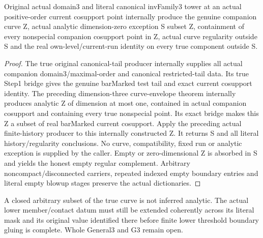 \begin{theorem}
\label{hir:step-one-actual-general-three-companion-curve-history}
\leanok
Original actual domain3 and literal canonical invFamily3 tower at an actual
positive-order current cosupport point internally produce the genuine
companion curve Z, actual analytic dimension-zero exception S subset Z,
containment of every nonspecial companion cosupport point in Z, actual curve
regularity outside S and the real own-level/current-run identity on every
true component outside S.
\end{theorem}
\begin{proof}
The true original canonical-tail producer internally supplies all actual
companion domain3/maximal-order and canonical restricted-tail data. Its true
Step1 bridge gives the genuine barMarked test tail and exact current cosupport
identity. The preceding dimension-three curve-envelope theorem internally
produces analytic Z of dimension at most one, contained in actual companion
cosupport and containing every true nonspecial point. Its exact bridge makes
this Z a subset of real barMarked current cosupport. Apply the preceding actual
finite-history producer to this internally constructed Z. It returns S and all
literal history/regularity conclusions. No curve, compatibility, fixed run or
analytic exception is supplied by the caller. Empty or zero-dimensional Z is
absorbed in S and yields the honest empty regular complement. Arbitrary
noncompact/disconnected carriers, repeated indexed empty boundary entries and
literal empty blowup stages preserve the actual dictionaries.
\end{proof}

\begin{remark}
A closed arbitrary subset of the true curve is not inferred analytic. The
actual lower member/contact datum must still be extended coherently across its
literal mask and its original value identified there before finite lower
threshold boundary gluing is complete. Whole General3 and G3 remain open.
\end{remark}
